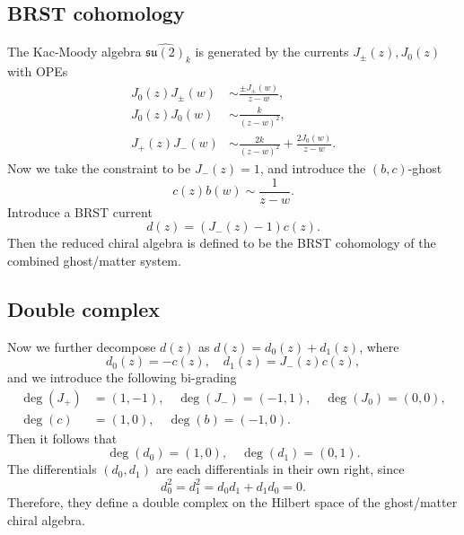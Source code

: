 \documentclass[a4paper,11pt]{article}
\begin{document}
\subsection{BRST cohomology}
The Kac-Moody algebra $\widehat{\mathfrak{su}(2)}_k$ is generated by the currents $J_\pm (z), J_0 (z)$ with OPEs
\begin{align}
    J_0(z) J_\pm (w) &\sim \frac{\pm J_\pm (w)}{z-w},\\
    J_0(z) J_0(w) &\sim \frac{k}{(z-w)^2},\\
    J_+(z) J_-(w) &\sim \frac{2k}{(z-w)^2} + \frac{2J_0(w)}{z-w}.
\end{align}
Now we take the constraint to be $J_-(z) = 1$, and introduce the $(b,c)$-ghost
\begin{equation}
    c(z) b(w) \sim \frac{1}{z-w}.
\end{equation}
Introduce a BRST current
\begin{equation}
    d(z)  = (J_-(z) -1) c(z).
\end{equation}
Then the reduced chiral algebra is defined to be the BRST cohomology of the combined ghost/matter system.

\subsection{Double complex}
Now we further decompose $d(z)$ as $d(z) = d_0(z) + d_1(z)$, where
\begin{equation}
    d_0(z) = - c(z), \quad d_1(z) = J_-(z) c(z),
\end{equation}
and we introduce the following bi-grading
\begin{equation}
\begin{aligned}
    \deg(J_+) &= (1,-1), \quad
    \deg(J_-) = (-1, 1), \quad
    \deg(J_0) = (0,0),\\
    \deg(c) &= (1,0), \quad 
    \deg(b) = (-1, 0).
\end{aligned}
\end{equation}
Then it follows that
\begin{equation}
    \deg(d_0) = (1,0), \quad \deg(d_1) = (0,1).
\end{equation}
The differentials $(d_0, d_1)$ are each differentials in their own right, since
\begin{equation}
    d_0^2 = d_1^2 = d_0 d_1 + d_1 d_0 = 0.
\end{equation}
Therefore, they define a double complex on the Hilbert space of the ghost/matter chiral algebra.
\end{document}
